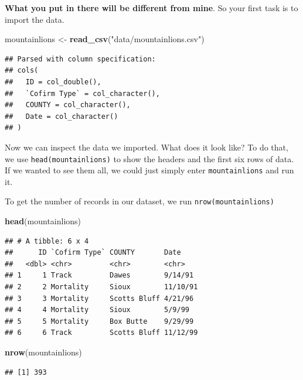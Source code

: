 \documentclass[]{book}
\newenvironment{Shaded}{\begin{snugshade}}{\end{snugshade}}
\newcommand{\KeywordTok}[1]{\textcolor[rgb]{0.13,0.29,0.53}{\textbf{#1}}}
\newcommand{\NormalTok}[1]{#1}
\newcommand{\StringTok}[1]{\textcolor[rgb]{0.31,0.60,0.02}{#1}}
\begin{document}
\textbf{What you put in there will be different from mine}. So your first task is to import the data.

\begin{Shaded}
\begin{Highlighting}[]
\NormalTok{mountainlions <-}\StringTok{ }\KeywordTok{read_csv}\NormalTok{(}\StringTok{"data/mountainlions.csv"}\NormalTok{)}
\end{Highlighting}
\end{Shaded}

\begin{verbatim}
## Parsed with column specification:
## cols(
##   ID = col_double(),
##   `Cofirm Type` = col_character(),
##   COUNTY = col_character(),
##   Date = col_character()
## )
\end{verbatim}

Now we can inspect the data we imported. What does it look like? To do that, we use \texttt{head(mountainlions)} to show the headers and the first six rows of data. If we wanted to see them all, we could just simply enter \texttt{mountainlions} and run it.

To get the number of records in our dataset, we run \texttt{nrow(mountainlions)}

\begin{Shaded}
\begin{Highlighting}[]
\KeywordTok{head}\NormalTok{(mountainlions)}
\end{Highlighting}
\end{Shaded}

\begin{verbatim}
## # A tibble: 6 x 4
##      ID `Cofirm Type` COUNTY       Date    
##   <dbl> <chr>         <chr>        <chr>   
## 1     1 Track         Dawes        9/14/91 
## 2     2 Mortality     Sioux        11/10/91
## 3     3 Mortality     Scotts Bluff 4/21/96 
## 4     4 Mortality     Sioux        5/9/99  
## 5     5 Mortality     Box Butte    9/29/99 
## 6     6 Track         Scotts Bluff 11/12/99
\end{verbatim}

\begin{Shaded}
\begin{Highlighting}[]
\KeywordTok{nrow}\NormalTok{(mountainlions)}
\end{Highlighting}
\end{Shaded}

\begin{verbatim}
## [1] 393
\end{verbatim}
\end{document}
